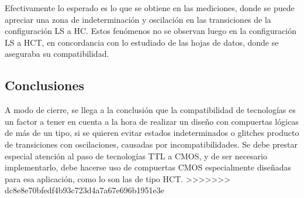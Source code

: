 Efectivamente lo esperado es lo que se obtiene en las mediciones, donde se puede apreciar una zona de indeterminación y oscilación en las transiciones de la configuración 
LS a HC.
Estos fenómenos no se observan luego en la configuración LS a HCT, en concordancia con lo estudiado de las hojas de datos, donde se aseguraba su compatibilidad.



\subsection{Conclusiones}
A modo de cierre, se llega a la conclusión que la compatibilidad de tecnologías es un factor a tener en cuenta a la hora de realizar un diseño con compuertas lógicas de 
más de un tipo, si se quieren evitar estados indeterminados o glitches producto de transiciones con oscilaciones, causadas por incompatibilidades.
Se debe prestar especial atención al paso de tecnologías TTL a CMOS, y de ser necesario implementarlo, debe hacerse uso de compuertas CMOS especialmente diseñadas para 
esa aplicación, como lo son las de tipo HCT.
>>>>>>> dc8e8e70bfedf4b93c723d4a7a67e696b1951e3e

